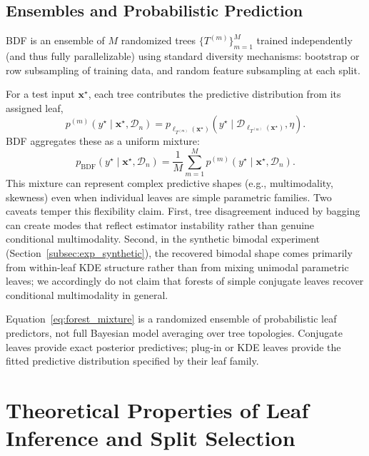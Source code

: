 \documentclass[10pt]{article} %
\begin{document}
\subsection{Ensembles and Probabilistic Prediction}\label{subsec:ensemble}

BDF is an ensemble of $M$ randomized trees $\{T^{(m)}\}_{m=1}^M$ trained independently (and thus fully parallelizable) using standard diversity mechanisms: bootstrap or row subsampling of training data, and random feature subsampling at each split.

For a test input $\mathbf{x}^\star$, each tree contributes the predictive distribution from its assigned leaf,
\[
p^{(m)}(y^\star\mid \mathbf{x}^\star,\mathcal{D}_n)
=
p_{\ell_{T^{(m)}}(\mathbf{x}^\star)}(y^\star \mid \mathcal{D}_{\ell_{T^{(m)}}(\mathbf{x}^\star)},\eta).
\]
BDF aggregates these as a uniform mixture:
\begin{equation}\label{eq:forest_mixture}
p_{\mathrm{BDF}}(y^\star\mid \mathbf{x}^\star,\mathcal{D}_n)
=
\frac{1}{M}\sum_{m=1}^M p^{(m)}(y^\star\mid \mathbf{x}^\star,\mathcal{D}_n).
\end{equation}
This mixture can represent complex predictive shapes (e.g., multimodality, skewness) even when individual leaves are simple parametric families. Two caveats temper this flexibility claim. First, tree disagreement induced by bagging can create modes that reflect estimator instability rather than genuine conditional multimodality. Second, in the synthetic bimodal experiment (Section~\ref{subsec:exp_synthetic}), the recovered bimodal shape comes primarily from within-leaf KDE structure rather than from mixing unimodal parametric leaves; we accordingly do not claim that forests of simple conjugate leaves recover conditional multimodality in general.

Equation~\eqref{eq:forest_mixture} is a randomized ensemble of probabilistic leaf predictors, not full Bayesian model averaging over tree topologies. Conjugate leaves provide exact posterior predictives; plug-in or KDE leaves provide the fitted predictive distribution specified by their leaf family.


\section{Theoretical Properties of Leaf Inference and Split Selection}\label{sec:theory}
\end{document}
